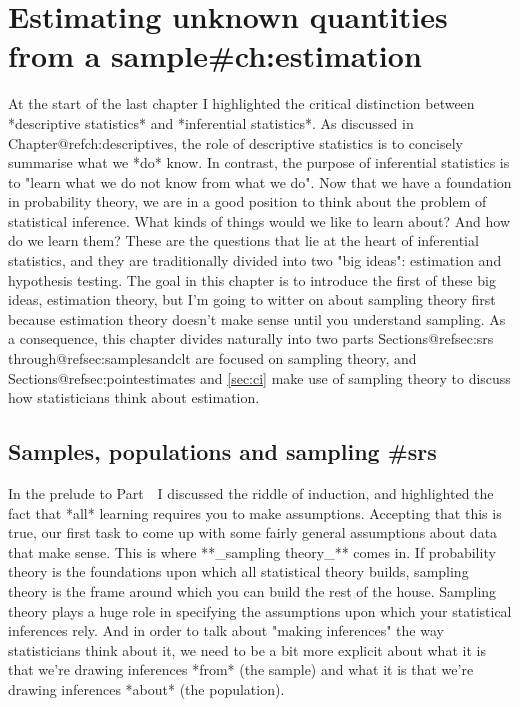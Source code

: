 
\chapter{Estimating unknown quantities from a sample{#ch:estimation}}

 
At the start of the last chapter I highlighted the critical distinction between *descriptive statistics* and *inferential statistics*. As discussed in Chapter@refch:descriptives, the role of descriptive statistics is to concisely summarise what we *do* know. In contrast, the purpose of inferential statistics is to "learn what we do not know from what we do". Now that we have a foundation in probability theory, we are in a good position to think about the problem of statistical inference. What kinds of things would we like to learn about? And how do we learn them? These are the questions that lie at the heart of inferential statistics, and they are traditionally divided into two "big ideas": estimation and hypothesis testing. The goal in this chapter is to introduce the first of these big ideas, estimation theory, but I'm going to witter on about sampling theory first because estimation theory doesn't make sense until you understand sampling. As a consequence, this chapter divides naturally into two parts Sections@refsec:srs through@refsec:samplesandclt are focused on sampling theory, and Sections@refsec:pointestimates and \ref{sec:ci} make use of sampling theory to discuss how statisticians think about estimation.


\section{Samples, populations and sampling {#srs}}

In the prelude to Part~\thepart\ I discussed the riddle of induction, and highlighted the fact that *all* learning requires you to make assumptions. Accepting that this is true, our first task to come up with some fairly general assumptions about data that make sense. This is where **_sampling theory_** comes in. If probability theory is the foundations upon which all statistical theory builds, sampling theory is the frame around which you can build the rest of the house. Sampling theory plays a huge role in specifying the assumptions upon which your statistical inferences rely. And in order to talk about "making inferences" the way statisticians think about it, we need to be a bit more explicit about what it is that we're drawing inferences *from* (the sample) and what it is that we're drawing inferences *about* (the population).  

